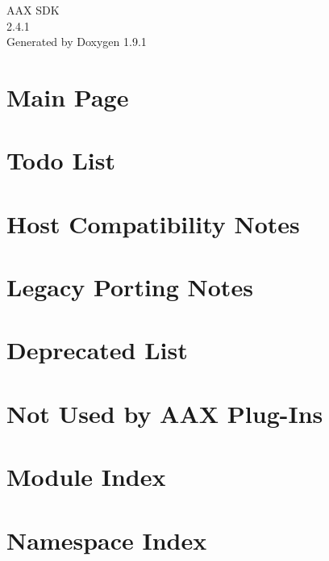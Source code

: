 \let\mypdfximage\pdfximage\def\pdfximage{\immediate\mypdfximage}\documentclass[twoside]{book}
\newcommand{\+}{\discretionary{\mbox{\scriptsize$\hookleftarrow$}}{}{}}
\newcommand{\clearemptydoublepage}{%
  \newpage{\pagestyle{empty}\cleardoublepage}%
}
\begin{document}
\raggedbottom

\hypersetup{pageanchor=false,
             bookmarksnumbered=true,
             pdfencoding=unicode
            }
\begin{titlepage}
\vspace*{7cm}
\begin{center}%
{\Large AAX SDK \\[1ex]\large 2.\+4.\+1 }\\
\vspace*{1cm}
{\large Generated by Doxygen 1.9.1}\\
\end{center}
\end{titlepage}
\clearemptydoublepage
{}
\tableofcontents
\clearemptydoublepage
{}
\hypersetup{pageanchor=true}

\chapter{Main Page}
\label{index}\hypertarget{index}{}
\chapter{Todo List}
\label{a00800}

\chapter{Host Compatibility Notes}
\label{a00801}

\chapter{Legacy Porting Notes}
\label{a00802}

\chapter{Deprecated List}
\label{a00803}

\chapter{Not Used by AAX Plug-\/\+Ins}
\label{a00804}

\chapter{Module Index}

\chapter{Namespace Index}

\end{document}
